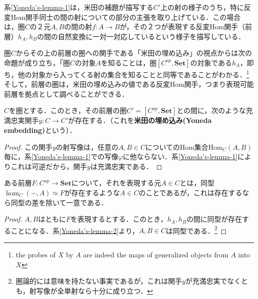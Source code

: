 \documentclass[uplatex, 12pt, dvipdfmx]{jsreport}
\begin{document}
系\ref{Yoneda's-lemma-1}は，米田の補題が描写する$C'$上の射の様子のうち，特に反変Hom関手同士の間の射についての部分の主張を取り上げている．この場合は，圏$C$の２元$A,B$の間の射$f:A\to B$が，その２つが表現する反変Hom関手（前層）$h_A,h_B$の間の自然変換に一対一対応しているという様子を描写している．

圏$C$からその上の前層の圏への関手である「米田の埋め込み」の視点からは次の命題が成り立ち，「圏$C$の対象$A$を知ることは，圏$[C^{op},\mathbf{Set}]$の対象である$h_A$，即ち，他の対象から入ってくる射の集合を知ることと同等であることがわかる．\footnote{the probes of $X$ by $A$ are indeed the maps of generalized objects from $A$ into $X$}
そして，前層の圏は，米田の埋め込みの値である反変Hom関手，つまり表現可能前層を拠点として調べることができる．
\begin{corollary}\rm{}\label{Yoneda's-lemma-2}
    $C$を圏とする．このとき，その前層の圏$C'=[C^{op},\mathbf{Set}]$との間に，次のような充満忠実関手$y:C\to C'$が存在する．（これを\textbf{米田の埋め込み(Yoneda embedding)}という）．
    \begin{center}\end{center}
\end{corollary}
\begin{proof}\rm{}
    この関手$y$の射写像は，任意の$A,B\in C$についてのHom集合$\mathrm{Hom}_C(A,B)$毎に，系\ref{Yoneda's-lemma-1}での写像$\varphi$に他ならない．系\ref{Yoneda's-lemma-1}によりこれは可逆だから，関手$y$は充満忠実である．
\end{proof}


\begin{corollary}\label{Yoneda's-lemma-3}
    ある前層$F:C^{op}\to\mathbf{Set}$について，それを表現する元$A\in C$とは，同型$\hom_C(-,A)\simeq F$が存在するような$A\in C$のことであるが，これは存在するなら同型の差を除いて一意である．
\end{corollary}
\begin{proof}
    $A,B$はともに$F$を表現するとする．このとき，$h_A,h_B$の間に同型が存在することになる．系\ref{Yoneda's-lemma-2}より，$A,B\in C$は同型である．\footnote{圏論的には意味を持たない事実であるが，これは関手$y$が充満忠実でなくとも，射写像が全単射なら十分に成り立つ．}
\end{proof}
\end{document}
